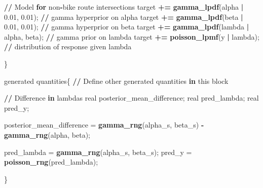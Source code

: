 \documentclass[
]{article}
\newenvironment{Shaded}{\begin{snugshade}}{\end{snugshade}}
\newcommand{\ControlFlowTok}[1]{\textcolor[rgb]{0.13,0.29,0.53}{\textbf{#1}}}
\newcommand{\ErrorTok}[1]{\textcolor[rgb]{0.64,0.00,0.00}{\textbf{#1}}}
\newcommand{\FloatTok}[1]{\textcolor[rgb]{0.00,0.00,0.81}{#1}}
\newcommand{\KeywordTok}[1]{\textcolor[rgb]{0.13,0.29,0.53}{\textbf{#1}}}
\newcommand{\NormalTok}[1]{#1}
\newcommand{\OperatorTok}[1]{\textcolor[rgb]{0.81,0.36,0.00}{\textbf{#1}}}
\newcommand{\StringTok}[1]{\textcolor[rgb]{0.31,0.60,0.02}{#1}}
\begin{document}
\begin{Shaded}
\begin{Highlighting}[]
    \OperatorTok{/}\ErrorTok{/}\StringTok{ }\NormalTok{Model }\ControlFlowTok{for}\NormalTok{ non}\OperatorTok{-}\NormalTok{bike route intersections}
\NormalTok{  target }\OperatorTok{+}\ErrorTok{=}\StringTok{ }\KeywordTok{gamma_lpdf}\NormalTok{(alpha }\OperatorTok{|}\StringTok{ }\FloatTok{0.01}\NormalTok{, }\FloatTok{0.01}\NormalTok{); }\OperatorTok{/}\ErrorTok{/}\StringTok{ }\NormalTok{gamma hyperprior on alpha}
\NormalTok{  target }\OperatorTok{+}\ErrorTok{=}\StringTok{ }\KeywordTok{gamma_lpdf}\NormalTok{(beta }\OperatorTok{|}\StringTok{ }\FloatTok{0.01}\NormalTok{, }\FloatTok{0.01}\NormalTok{); }\OperatorTok{/}\ErrorTok{/}\StringTok{ }\NormalTok{gamma hyperprior on beta}
\NormalTok{  target }\OperatorTok{+}\ErrorTok{=}\StringTok{ }\KeywordTok{gamma_lpdf}\NormalTok{(lambda }\OperatorTok{|}\StringTok{ }\NormalTok{alpha, beta); }\OperatorTok{/}\ErrorTok{/}\StringTok{ }\NormalTok{gamma prior on lambda}
\NormalTok{  target }\OperatorTok{+}\ErrorTok{=}\StringTok{ }\KeywordTok{poisson_lpmf}\NormalTok{(y }\OperatorTok{|}\StringTok{ }\NormalTok{lambda); }\OperatorTok{/}\ErrorTok{/}\StringTok{ }\NormalTok{distribution of response given lambda}
  
\NormalTok{\}}

\NormalTok{generated quantities\{}
  \OperatorTok{/}\ErrorTok{/}\StringTok{ }\NormalTok{Define other generated quantities }\ControlFlowTok{in}\NormalTok{ this block}
  
  \OperatorTok{/}\ErrorTok{/}\StringTok{ }\NormalTok{Difference }\ControlFlowTok{in}\NormalTok{ lambdas}
\NormalTok{ real posterior_mean_difference;}
\NormalTok{ real pred_lambda;}
\NormalTok{ real pred_y;}
 
  
\NormalTok{ posterior_mean_difference =}\StringTok{ }\KeywordTok{gamma_rng}\NormalTok{(alpha_s, beta_s) }\OperatorTok{-}\StringTok{ }\KeywordTok{gamma_rng}\NormalTok{(alpha, beta);}
 
\NormalTok{ pred_lambda =}\StringTok{ }\KeywordTok{gamma_rng}\NormalTok{(alpha_s, beta_s);}
\NormalTok{ pred_y =}\StringTok{ }\KeywordTok{poisson_rng}\NormalTok{(pred_lambda);}

  
\NormalTok{\}}


\end{Highlighting}
\end{Shaded}
\end{document}
